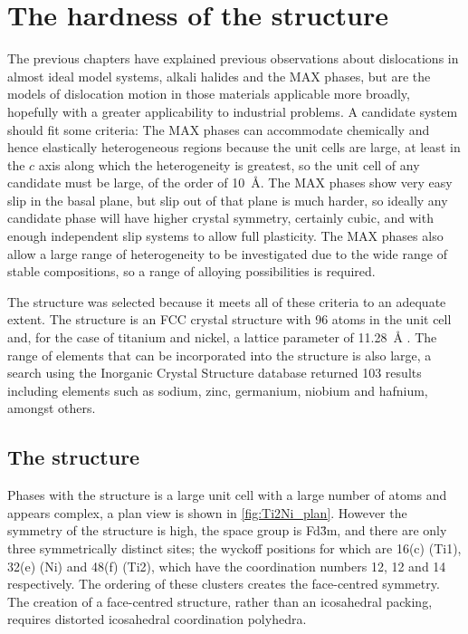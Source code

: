 

\chapter{\texorpdfstring{The hardness of the  structure}{The hardness of the Ti2Ni structure}}
\graphicspath{{hardness_of_ti_2_ni/Figs/}}
\label{chap:ti2ni_hardness}



The previous chapters have explained previous observations about dislocations in almost ideal model systems, alkali halides and the MAX phases, but are the models of dislocation motion in those materials applicable more broadly, hopefully with a greater applicability to industrial problems. A candidate system should fit some criteria: The MAX phases can accommodate chemically and hence elastically heterogeneous regions because the unit cells are large, at least in the $c$ axis along which the heterogeneity is greatest, so the unit cell of any candidate must be large, of the order of \SI{10}{\angstrom}. The MAX phases show very easy slip in the basal plane, but slip out of that plane is much harder, so ideally any candidate phase will have higher crystal symmetry, certainly cubic, and with enough independent slip systems to allow full plasticity. The MAX phases also allow a large range of heterogeneity to be investigated due to the wide range of stable compositions, so a range of alloying possibilities is required.

The  structure was selected because it meets all of these criteria to an adequate extent. The structure is an FCC crystal structure with 96 atoms in the unit cell and, for the case of titanium and nickel, a lattice parameter of \SI{11.28}{\angstrom} \cite{Yurko1959,Yurko1962}. The range of elements that can be incorporated into the structure is also large, a search using the Inorganic Crystal Structure database \cite{ICSD} returned 103 results including elements such as sodium,  zinc, germanium, niobium and hafnium, amongst others.

\section{The \texorpdfstring{}{Ti2Ni} structure}
\FloatBarrier


Phases with the  structure is a large unit cell with a large number of atoms and appears complex, a plan view is shown in \autoref{fig:Ti2Ni_plan}. However the symmetry of the structure is high, the space group is Fd\={3}m, and there are only three symmetrically distinct sites; the wyckoff positions for which are 16(c) (Ti1), 32(e) (Ni) and 48(f) (Ti2), which have the coordination numbers 12, 12 and 14 respectively. The ordering of these clusters creates the face-centred symmetry. The creation of a face-centred structure, rather than an icosahedral packing, requires distorted icosahedral coordination polyhedra.


